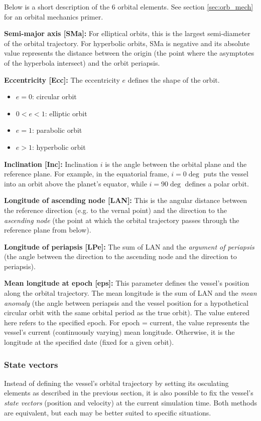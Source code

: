 \documentclass[Orbiter User Manual.tex]{subfiles}
\begin{document}
Below is a short description of the 6 orbital elements. See section
\ref{sec:orb_mech} for an orbital mechanics primer.


\textbf{Semi-major axis [SMa]:}
For elliptical orbits, this is the largest semi-diameter of the orbital
trajectory. For hyperbolic orbits, SMa is negative and its absolute value
represents the distance between the origin (the point where the asymptotes of
the hyperbola intersect) and the orbit periapsis.

\textbf{Eccentricity [Ecc]:}
The eccentricity $e$ defines the shape of the orbit.

\begin{itemize}
	\item $e = 0$: circular orbit
	\item $0 < e < 1$: elliptic orbit
	\item $e = 1$: parabolic orbit
	\item $e > 1$: hyperbolic orbit
\end{itemize}

\textbf{Inclination [Inc]:}
Inclination $i$ is the angle between the orbital plane and the reference plane.
For example, in the equatorial frame, $i = 0\deg{}$ puts the vessel into an
orbit above the planet's equator, while $i = 90\deg{}$ defines a polar orbit.

\textbf{Longitude of ascending node [LAN]:}
This is the angular distance between the reference direction (e.g. to the vernal
point) and the direction to the \emph{ascending node} (the point at which the
orbital trajectory passes through the reference plane from below).

\textbf{Longitude of periapsis [LPe]:}
The sum of LAN and the \emph{argument of periapsis} (the angle between the
direction to the ascending node and the direction to periapsis).

\textbf{Mean longitude at epoch [eps]:}
This parameter defines the vessel's position along the orbital trajectory. The
mean longitude is the sum of LAN and the \emph{mean anomaly} (the angle between
periapsis and the vessel position for a hypothetical circular orbit with the
same orbital period as the true orbit). The value entered here refers to the
specified epoch. For epoch = current, the value represents the vessel's current
(continuously varying) mean longitude. Otherwise, it is the longitude at the
specified date (fixed for a given orbit).


\subsubsection{State vectors}
Instead of defining the vessel's orbital trajectory by setting its osculating
elements as described in the previous section, it is also possible to fix the
vessel's \emph{state vectors} (position and velocity) at the current simulation
time. Both methods are equivalent, but each may be better suited to specific
situations.
\end{document}
